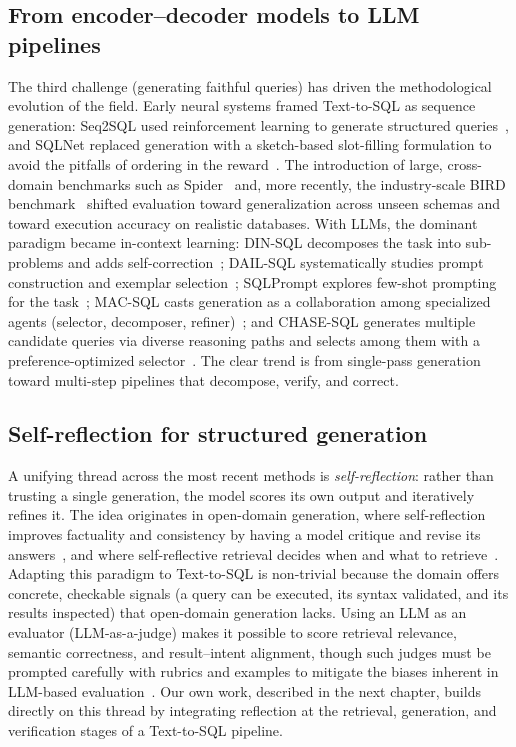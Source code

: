 \subsection{From encoder--decoder models to LLM pipelines}
The third challenge (generating faithful queries) has driven the methodological evolution of the field. Early neural systems framed Text-to-SQL as sequence generation: Seq2SQL used reinforcement learning to generate structured queries~\cite{zhong2017seq2sql}, and SQLNet replaced generation with a sketch-based slot-filling formulation to avoid the pitfalls of ordering in the reward~\cite{xu2017sqlnet}. The introduction of large, cross-domain benchmarks such as Spider~\cite{yu2018spider} and, more recently, the industry-scale BIRD benchmark~\cite{li2023bird} shifted evaluation toward generalization across unseen schemas and toward execution accuracy on realistic databases. With LLMs, the dominant paradigm became in-context learning: DIN-SQL decomposes the task into sub-problems and adds self-correction~\cite{pourreza2023din}; DAIL-SQL systematically studies prompt construction and exemplar selection~\cite{gao2023text}; SQLPrompt explores few-shot prompting for the task~\cite{sun2023sqlprompt}; MAC-SQL casts generation as a collaboration among specialized agents (selector, decomposer, refiner)~\cite{wang2024mac}; and CHASE-SQL generates multiple candidate queries via diverse reasoning paths and selects among them with a preference-optimized selector~\cite{pourreza2024chase}. The clear trend is from single-pass generation toward multi-step pipelines that decompose, verify, and correct.

\subsection{Self-reflection for structured generation}
A unifying thread across the most recent methods is \emph{self-reflection}: rather than trusting a single generation, the model scores its own output and iteratively refines it. The idea originates in open-domain generation, where self-reflection improves factuality and consistency by having a model critique and revise its answers~\cite{ji2023towards}, and where self-reflective retrieval decides when and what to retrieve~\cite{asai2023self}. Adapting this paradigm to Text-to-SQL is non-trivial because the domain offers concrete, checkable signals (a query can be executed, its syntax validated, and its results inspected) that open-domain generation lacks. Using an LLM as an evaluator (LLM-as-a-judge) makes it possible to score retrieval relevance, semantic correctness, and result--intent alignment, though such judges must be prompted carefully with rubrics and examples to mitigate the biases inherent in LLM-based evaluation~\cite{zheng2023judging}. Our own work, described in the next chapter, builds directly on this thread by integrating reflection at the retrieval, generation, and verification stages of a Text-to-SQL pipeline.

